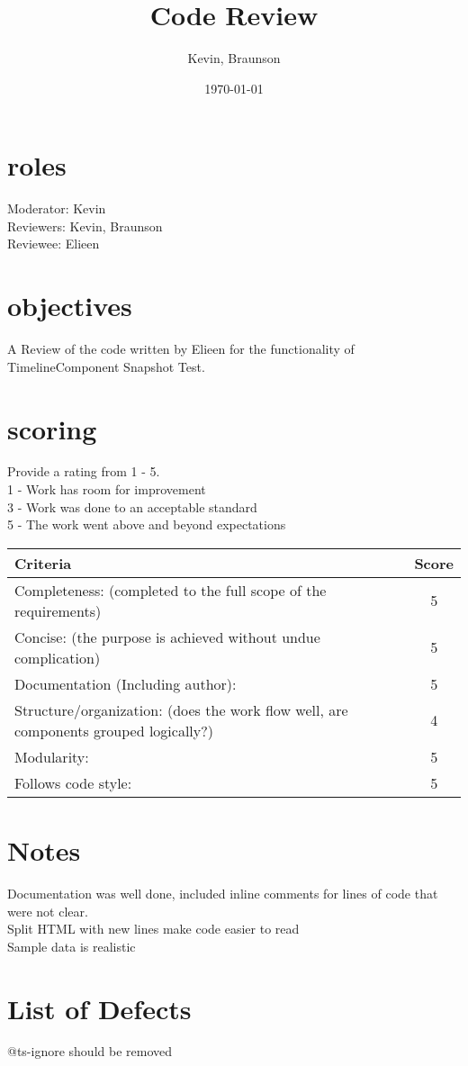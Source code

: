 \documentclass{article}
\title{Code Review}
\author{Kevin, Braunson}
\date{\today}
\begin{document}
\maketitle

\section{roles}
Moderator: Kevin \\
Reviewers: Kevin, Braunson\\
Reviewee: Elieen\\

\section{objectives}
A Review of the code written by Elieen for the functionality of TimelineComponent Snapshot Test. 


\section{scoring}
    Provide a rating from 1 - 5. \\
    1 - Work has room for improvement \\
    3 - Work was done to an acceptable standard \\
    5 - The work went above and beyond expectations\\

\begin{tabular}{|l|c|}
	\hline
	Criteria & Score\\
	\hline
    Completeness:
    (completed to the full scope of the requirements) & 5 \\
	\hline
    Concise:
    (the purpose is achieved without undue complication) & 5 \\
	\hline
    Documentation (Including author): & 5\\
    \hline
    Structure/organization:
    (does the work flow well, are components grouped logically?) & 4\\
    \hline
    Modularity: & 5\\
    \hline
    Follows code style: & 5\\
    \hline
\end{tabular}

\section{Notes}

Documentation was well done, included inline comments for lines of code that were not clear.\\
Split HTML with new lines make code easier to read\\
Sample data is realistic\\

\pagebreak

\section{List of Defects}
@ts-ignore should be removed\\
\end{document}
